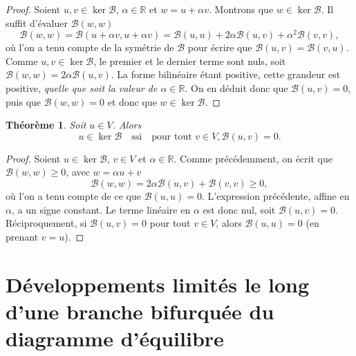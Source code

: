 \documentclass[12pt, final]{amsart}
\newtheorem{theorem}{Théorème}
\begin{document}
\begin{proof}
  Soient $u, v \in \ker \mathcal{B}$, $\alpha \in \mathbb{R}$ et $w = u +
  \alpha v$. Montrons que $w \in \ker \mathcal{B}$. Il suffit d'évaluer
  $\mathcal{B} (w, w)$
  \begin{equation}
    \mathcal{B} (w, w) =\mathcal{B} (u + \alpha v, u + \alpha v) =\mathcal{B}
    (u, u) + 2 \alpha \mathcal{B} (u, v) + \alpha^2 \mathcal{B} (v, v),
  \end{equation}
  o{\`u} l'on a tenu compte de la symétrie de $\mathcal{B}$ pour
  écrire que $\mathcal{B} (u, v) =\mathcal{B} (v, u)$. Comme $u, v \in
  \ker \mathcal{B}$, le premier et le dernier terme sont nuls, soit
  $\mathcal{B} (w, w) = 2 \alpha \mathcal{B} (u, v)$. La forme bilinéaire
  étant positive, cette grandeur est positive, \emph{quelle que soit la
  valeur de $\alpha \in \mathbb{R}$}. On en déduit donc que $\mathcal{B}
  (u, v) = 0$, puis que $\mathcal{B} (w, w) = 0$ et donc que $w \in \ker
  \mathcal{B}.$
\end{proof}

\begin{theorem}
  Soit $u \in V$. Alors
  \begin{equation}
    u \in \ker \mathcal{B} \quad \text{ssi} \quad \text{pour tout } v \in V,
    \mathcal{B} (u, v) = 0.
  \end{equation}
\end{theorem}

\begin{proof}
  Soient $u \in \ker \mathcal{B}$, $v \in V$ et $\alpha \in \mathbb{R}$. Comme
  précédemment, on écrit que $\mathcal{B} (w, w) \geq 0$, avec $w
  = \alpha u + v$
  \begin{equation}
    \mathcal{B} (w, w) = 2 \alpha \mathcal{B} (u, v) +\mathcal{B} (v, v) \geq
    0,
  \end{equation}
  o{\`u} l'on a tenu compte de ce que $\mathcal{B} (u, u) = 0$. L'expression
  précédente, affine en $\alpha$, a un signe constant. Le terme
  linéaire en $\alpha$ est donc nul, soit $\mathcal{B} (u, v) = 0$.
  Réciproquement, si $\mathcal{B} (u, v) = 0$ pour tout $v \in V$, alors
  $\mathcal{B} (u, u) = 0$ (en prenant $v = u$).
\end{proof}

\section{Développements limités le long d'une branche bifurquée du
diagramme d'équilibre}
\end{document}
